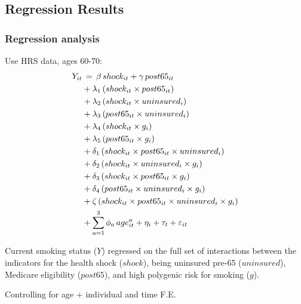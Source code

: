 \documentclass[10pt,compress,xcolor=dvipsnames]{beamer}    %
\newcounter{ex}
\newcommand{\1}[1]{\mathrm{1\hspace*{-2.5pt}l}[#1]}	%
\begin{document}
\subsection{Regression Results}
\begin{frame}\frametitle{Regression analysis}\label{frame:reg}
\begin{footnotesize}
Use HRS data, ages 60-70:
\begin{align*} \label{eq:OLS}
Y_{it}& \thinspace  = \thinspace
				\beta \thinspace shock_{it} + \gamma \thinspace post65_{it} \\
				&+\lambda_1 \thinspace  (shock_{it} \times post65_{it}) \nonumber \\
				&+ \lambda_2 \thinspace (shock_{it} \times uninsured_i) \nonumber \\
				&+\lambda_3  \thinspace (post65_{it} \times uninsured_i) \nonumber \\
				&+ \lambda_4 \thinspace (shock_{it} \times g_i) \nonumber \\
				&+\lambda_5 \thinspace (post65_{it} \times g_i) \nonumber \\
				&+ \delta_1 \thinspace (shock_{it} \times post65_{it} \times uninsured_i) \nonumber \\
				&+ \delta_2 \thinspace (shock_{it} \times uninsured_i \times g_i) \nonumber \\
				&+ \delta_3 \thinspace (shock_{it} \times post65_{it} \times g_i) \nonumber \\
				&+ \delta_4 \thinspace (post65_{it} \times uninsured_i \times g_i) \nonumber\\
				&+ \zeta \thinspace (shock_{it} \times post65_{it} \times uninsured_i \times g_i) \nonumber \\
				&+ \sum_{a=1}^3 \phi_a \thinspace age_{it}^{a} + \eta_i + \tau_t + \varepsilon_{it} \nonumber
\end{align*}

Current smoking status ($Y$) regressed on the full set of interactions between the indicators for the health shock ($shock$), being uninsured pre-65 ($uninsured$), Medicare eligibility ($post65$), and high polygenic risk for smoking ($g$).

Controlling for age + individual and time F.E.
\end{footnotesize}

\hyperlink{fig:maincoeffplot}{}
\end{frame}
\end{document}
